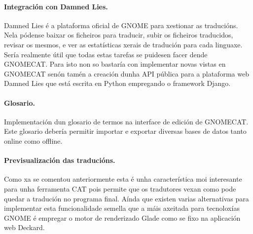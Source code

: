 \paragraph{Integración con Damned Lies.} Damned Lies é a plataforma oficial de GNOME para xestionar as traducións. Nela pódense baixar os ficheiros para traducir, subir os ficheiros traducidos, revisar os mesmos, e ver as estatísticas xerais de tradución para cada linguaxe. Sería realmente útil que todas estas tarefas se puidesen facer dende GNOMECAT. Para isto non so bastaría con implementar novas vistas en GNOMECAT senón tamén a creación dunha API pública para a plataforma web Damned Lies que está escrita en Python empregando o framework Django.

\paragraph{Glosario.} Implementación dun glosario de termos na interface de edición de GNOMECAT. Este glosario debería permitir importar e exportar diversas bases de datos tanto online como offline.

\paragraph{Previsualización das traducións.} Como xa se comentou anteriormente esta é unha característica moi interesante para unha ferramenta CAT pois permite que os tradutores vexan como pode quedar a tradución no programa final. Aínda que existen varias alternativas para implementar esta funcionalidade semella que a máis axeitada para tecnoloxías GNOME é empregar o motor de renderizado Glade como se fixo na aplicación web Deckard.
